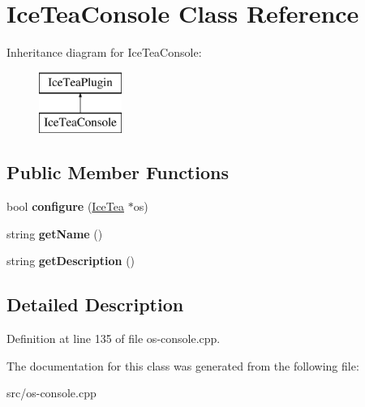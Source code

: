 \hypertarget{class_ice_tea_console}{}\section{Ice\+Tea\+Console Class Reference}
\label{class_ice_tea_console}
Inheritance diagram for Ice\+Tea\+Console\+:\begin{figure}[H]
\begin{center}
\leavevmode
\includegraphics[height=2.000000cm]{class_ice_tea_console}
\end{center}
\end{figure}
\subsection*{Public Member Functions}
\begin{DoxyCompactItemize}
\item 
bool {\bfseries configure} (\hyperlink{class_ice_tea}{Ice\+Tea} $\ast$os)\hypertarget{class_ice_tea_console_a9a4373570207f727b1886943ae68a70a}{}\label{class_ice_tea_console_a9a4373570207f727b1886943ae68a70a}

\item 
string {\bfseries get\+Name} ()\hypertarget{class_ice_tea_console_a2e4da4ac60ff5e0db3ea6bf627a6ddda}{}\label{class_ice_tea_console_a2e4da4ac60ff5e0db3ea6bf627a6ddda}

\item 
string {\bfseries get\+Description} ()\hypertarget{class_ice_tea_console_a8b1ed920296077e8d213ebbcc72a4a79}{}\label{class_ice_tea_console_a8b1ed920296077e8d213ebbcc72a4a79}

\end{DoxyCompactItemize}


\subsection{Detailed Description}


Definition at line 135 of file os-\/console.\+cpp.



The documentation for this class was generated from the following file\+:\begin{DoxyCompactItemize}
\item 
src/os-\/console.\+cpp\end{DoxyCompactItemize}
